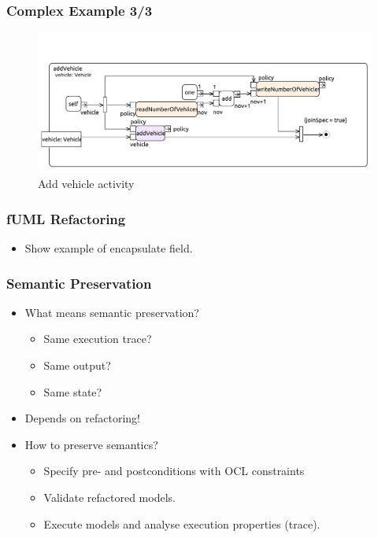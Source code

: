\documentclass{beamer}
\begin{document}
\begin{frame}
\frametitle{Complex Example 3/3}
\begin{figure}[h!t]
 \centering
 \includegraphics[scale=0.45]{images/insurance_ref/Activity_addVehicle_addVehicle}
 \caption{Add vehicle activity}
 \label{fig:calculatePremium}
\end{figure}
\end{frame}

        
\begin{frame}
\frametitle{fUML Refactoring}
    \begin{itemize}
     \item Show example of encapsulate field.
    \end{itemize}
\end{frame}
        
\begin{frame}
\frametitle{Semantic Preservation}
\begin{itemize}
 \item What means semantic preservation?
 \begin{itemize}
  \item Same execution trace?
  \item Same output?
  \item Same state?
 \end{itemize}
 \item Depends on refactoring!
 \item How to preserve semantics?
 \begin{itemize}
  \item Specify pre- and postconditions with OCL constraints
  \item Validate refactored models.
  \item Execute models and analyse execution properties (trace).
 \end{itemize}
\end{itemize}

\end{frame}
        
\end{document}
